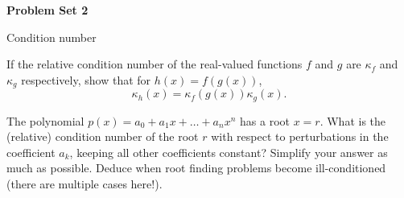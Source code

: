 \documentclass[11pt]{article}
\newcommand{\problem}[1]{\vspace{0.6em}\noindent{\large\bfseries #1.}\hspace{0.45em}}
\newcommand{\answerspace}{\par\vspace{3.5in}}
\begin{document}
\begin{center}
  {\fontsize{25}{30}\selectfont\bfseries Problem Set 2}\par
  \vspace{0.35em}
  {\large\color{gray!75!black}Condition number}
\end{center}
\vspace{0.75em}

\problem{1}
If the relative condition number of the real-valued functions $f$ and $g$ are $\kappa_f$ and $\kappa_g$ respectively, show that for $h(x) = f(g(x))$, 
$$\kappa_h(x) = \kappa_f(g(x))\kappa_g(x).$$
\answerspace

\vspace{-2in}
\problem{2}
The polynomial $p(x) = a_0 + a_1x + \ldots + a_nx^n$ has a root $x = r$. What is the (relative) condition number of the root $r$ with respect to perturbations in the coefficient $a_k$, keeping all other coefficients constant? Simplify your answer as much as possible. Deduce when root finding problems become ill-conditioned (there are multiple cases here!).
\answerspace
\end{document}

